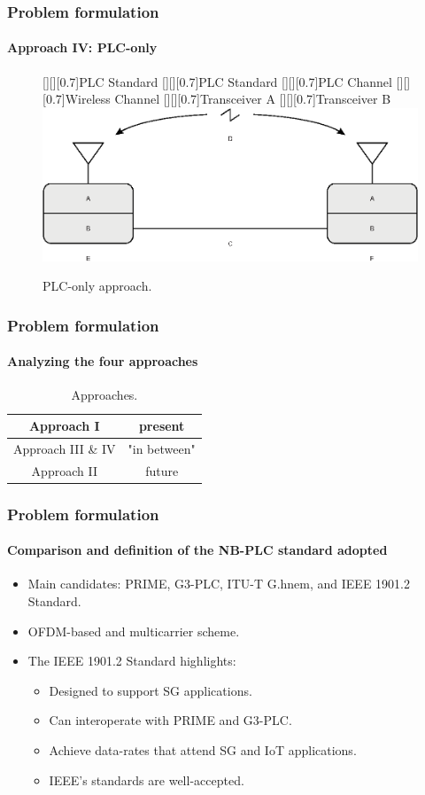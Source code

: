 \documentclass[mathserif]{beamer}
\newcommand{\wait}{\vfill}
\begin{document}
\begin{frame}
	\frametitle{Problem formulation}
	\framesubtitle{Approach IV: PLC-only}
	\renewcommand{\sizeLetter}{0.7}
	\begin{figure}[ht]
		\centering
		[][][\sizeLetter]{PLC Standard}
		[][][\sizeLetter]{PLC Standard}
		[][][\sizeLetter]{PLC Channel}
		[][][\sizeLetter]{Wireless Channel}
		[][][\sizeLetter]{Transceiver A}
		[][][\sizeLetter]{Transceiver B}
		\includegraphics[width=\linewidth]{figuras/plc_wl_scheme}
		\caption{PLC-only approach.}
		\label{fig:plcwlscheme4}
	\end{figure}
\end{frame}

\begin{frame}
	\frametitle{Problem formulation}
	\framesubtitle{Analyzing the four approaches}
	\begin{table}[ht]
		\centering
		\caption{Approaches.}
		\label{tab:approach}
		\begin{tabular}{c|c}
			\hline
			Approach I         & present      \\ \hline
			Approach III \& IV & "in between" \\ \hline
			Approach II        & future       \\ \hline
		\end{tabular}
	\end{table}
\end{frame}	

\begin{frame}
	\frametitle{Problem formulation}
	\framesubtitle{Comparison and definition of the NB-PLC standard adopted}
	\begin{itemize}
		\item Main candidates: PRIME, G3-PLC, ITU-T G.hnem, and IEEE 1901.2 Standard. \wait
		\item OFDM-based and multicarrier scheme. \wait
		\item The IEEE 1901.2 Standard highlights:
		\begin{itemize}
			\item Designed to support SG applications.
			\item Can interoperate with PRIME and G3-PLC.
			\item Achieve data-rates that attend SG and IoT applications.
			\item IEEE's standards are well-accepted.
		\end{itemize}		
	\end{itemize}	
\end{frame}
\end{document}
